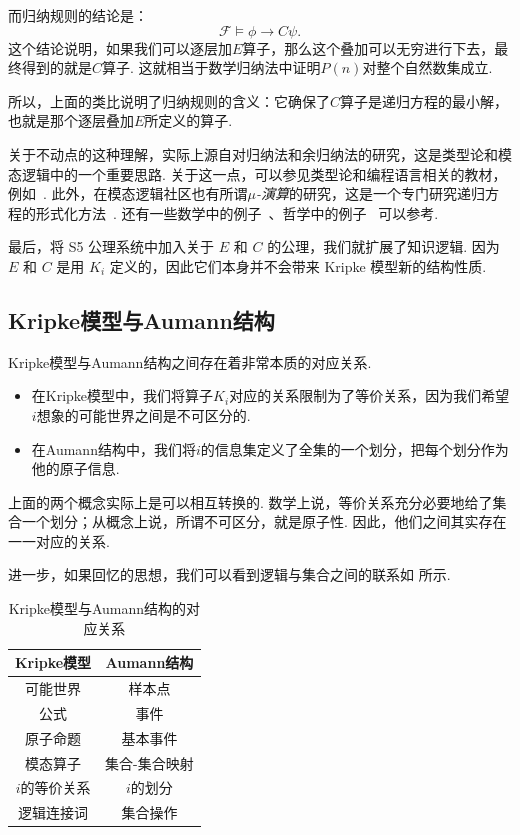 而归纳规则的结论是：
\[\mathcal  F\vDash \phi\to C\psi.\]
这个结论说明，如果我们可以逐层加$E$算子，那么这个叠加可以无穷进行下去，最终得到的就是$C$算子. 这就相当于数学归纳法中证明$P(n)$对整个自然数集成立. 

所以，上面的类比说明了归纳规则的含义：它确保了$C$算子是递归方程的最小解，也就是那个逐层叠加$E$所定义的算子. 

\begin{remark}
    关于不动点的这种理解，实际上源自对归纳法和余归纳法的研究，这是类型论和模态逻辑中的一个重要思路. 关于这一点，可以参见类型论和编程语言相关的教材，例如~\cite{pierceTypesProgrammingLanguages2002,pierceSoftwareFoundationsVolume,avigadTheoremProvingLean}. 此外，在模态逻辑社区也有所谓\textit{$\mu$-演算}的研究，这是一个专门研究递归方程的形式化方法~\cite{kozenResultsPropositionalMcalculus1982}. 还有一些数学中的例子~\cite{abdelgawadInductionCoinductionFixed2019}、哲学中的例子~\cite{linneboPredicativeImpredicativeDefinitions} 可以参考. 
\end{remark}

最后，将 S5 公理系统中加入关于 $E$ 和 $C$ 的公理，我们就扩展了知识逻辑. 因为 $E$ 和 $C$ 是用 $K_i$ 定义的，因此它们本身并不会带来 Kripke 模型新的结构性质. 

\subsection{Kripke模型与Aumann结构}

Kripke模型与Aumann结构之间存在着非常本质的对应关系. 
\begin{itemize}
    \item 在Kripke模型中，我们将算子$K_i$对应的关系限制为了等价关系，因为我们希望$i$想象的可能世界之间是不可区分的. 
    \item 在Aumann结构中，我们将$i$的信息集定义了全集的一个划分，把每个划分作为他的原子信息. 
\end{itemize}

上面的两个概念实际上是可以相互转换的. 数学上说，等价关系充分必要地给了集合一个划分；从概念上说，所谓不可区分，就是原子性. 因此，他们之间其实存在一一对应的关系. 

进一步，如果回忆的思想，我们可以看到逻辑与集合之间的联系如 所示. 

\begin{table}[ht]
    \centering
    \begin{tabular}{c|c}
    \toprule
    Kripke模型 & Aumann结构 \\
    \midrule
    可能世界 & 样本点 \\
    公式 & 事件 \\
    原子命题 & 基本事件 \\
    模态算子 & 集合-集合映射 \\
    $i$的等价关系 & $i$的划分 \\
    逻辑连接词 & 集合操作 \\
    \bottomrule
    \end{tabular}
    \caption{Kripke模型与Aumann结构的对应关系} \label{tab:Kripke-Aumann}
\end{table}

